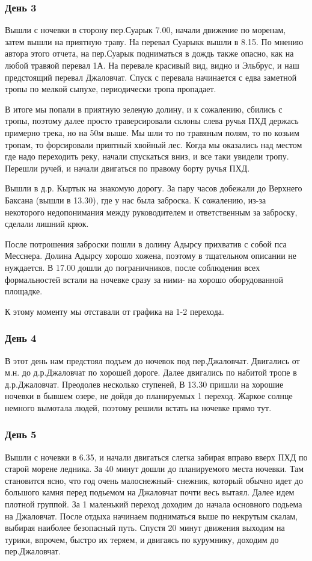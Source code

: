 \documentclass[]{article}
\begin{document}
\subsubsection{День 3}
Вышли с ночевки в сторону пер.Суарык  7.00, начали движение по моренам, затем вышли на приятную траву. На перевал Суарыкк вышли в 8.15. По мнению автора этого отчета, на пер.Суарык подниматься в дождь также опасно, как на любой травяой перевал 1А.
На перевале красивый вид, видно и Эльбрус, и наш предстоящий перевал Джаловчат.
Спуск с перевала начинается с едва заметной тропы по мелкой сыпухе, периодически тропа пропадает. 

В итоге мы попали в приятную зеленую долину, и к сожалению, сбились с тропы, поэтому далее просто траверсировали склоны  слева ручья ПХД держась примерно трека, но на 50м выше.
Мы шли то по травяным полям, то по козьим тропам, то форсировали приятный хвойный лес. Когда мы оказались над местом где надо переходить реку, начали спускаться вниз, и все таки увидели тропу.
Перешли ручей, и начали двигаться по правому борту ручья ПХД. 

Вышли в д.р. Кыртык на знакомую дорогу. За пару часов добежали до Верхнего Баксана (вышли в 13.30), где у нас  была заброска. К сожалению, из-за некоторого недопонимания между руководителем и ответственным за заброску, сделали лишний крюк.

После потрошения заброски пошли в долину Адырсу прихватив с собой пса Месснера. 
Долина Адырсу хорошо хожена, поэтому в тщательном описании не нуждается. 
В 17.00 дошли до пограничников, после соблюдения всех формальностей встали на ночевке сразу за ними- на хорошо оборудованной площадке.

К этому моменту мы отставали от графика на 1-2 перехода.


\subsubsection{День 4}	
В этот день нам предстоял подъем до ночевок под пер.Джаловчат. Двигались от м.н. до д.р.Джаловчат по хорошей дороге. Далее двигались по набитой тропе в д.р.Джаловчат. Преодолев несколько ступеней,  В 13.30 пришли на хорошие ночевки в бывшем озере, не дойдя до планируемых 1 переход. Жаркое солнце немного вымотала людей, поэтому решили встать на ночевке прямо тут.


\subsubsection{День 5}
Вышли с ночевки в 6.35, и начали двигаться слегка забирая вправо вверх ПХД по старой морене ледника. За 40 минут дошли до планируемого места ночевки. Там становится ясно, что год очень малоснежный- снежник, который обычно идет до большого камня перед подьемом на Джаловчат почти весь вытаял. Далее идем плотной группой. За 1 маленький переход доходим до начала основного подьема на Джаловчат. После отдыха начинаем подниматься выше по некрутым скалам, выбирая наиболее безопасный путь. Спустя 20 минут движения выходим на турики, впрочем, быстро их теряем, и двигаясь по курумнику, доходим до пер.Джаловчат.
\end{document}
